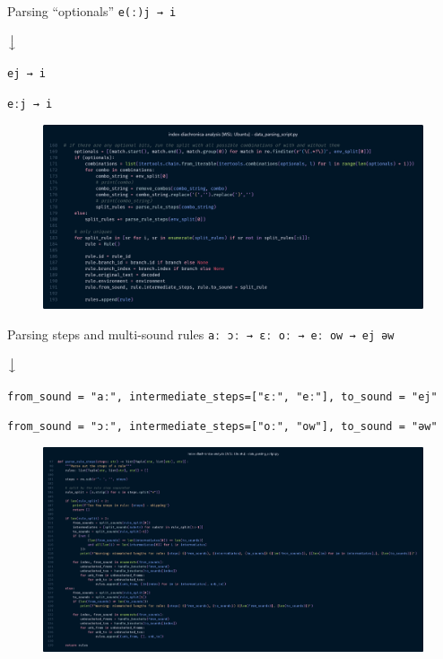 \documentclass[10pt]{beamer}
\begin{document}
  \begin{frame}[fragile=singleslide]{Parsing ``optionals''}
    \centering
    \verb|e(ː)j → i|
    
    \vspace*{5pt}

    $\big\downarrow$

    \vspace*{5pt}

    \verb|ej → i|

    \verb|eːj → i|

    \vspace*{5pt}

    \begin{figure}
      \centering
      \includegraphics[width=1\textwidth, height=0.5\textheight, keepaspectratio]{optionals.png}
    \end{figure}
  \end{frame}
  \begin{frame}[fragile=singleslide]{Parsing steps and multi-sound rules}
    \centering
    \verb|aː ɔː → ɛː oː → eː ow → ej əw|
    
    \vspace*{5pt}

    $\big\downarrow$

    \vspace*{5pt}

    \scriptsize \verb|from_sound = "aː", intermediate_steps=["ɛː", "eː"], to_sound = "ej"|
    
    \scriptsize \verb|from_sound = "ɔː", intermediate_steps=["oː", "ow"], to_sound = "əw"|

    \vspace*{5pt}

    \begin{figure}
      \centering
      \includegraphics[width=1\textwidth, height=0.5\textheight, keepaspectratio]{steps.png}
    \end{figure}
  \end{frame}
\end{document}
